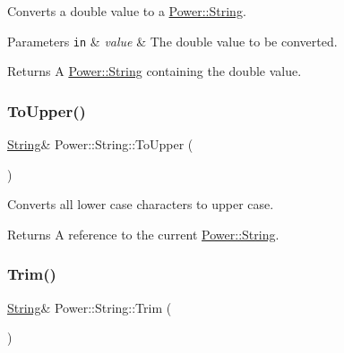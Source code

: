 Converts a double value to a \hyperlink{class_power_1_1_string}{Power\+::\+String}. 


\begin{DoxyParams}[1]{Parameters}
\mbox{\tt in}  & {\em value} & The double value to be converted. \\
\hline
\end{DoxyParams}
\begin{DoxyReturn}{Returns}
A \hyperlink{class_power_1_1_string}{Power\+::\+String} containing the double value. 
\end{DoxyReturn}
\mbox{\label{class_power_1_1_string_a032aabe48ca5b95b9e089998fb8806fa}} 
\subsubsection{\texorpdfstring{To\+Upper()}{ToUpper()}}
{\footnotesize\ttfamily \hyperlink{class_power_1_1_string}{String}\& Power\+::\+String\+::\+To\+Upper (\begin{DoxyParamCaption}{ }\end{DoxyParamCaption})\hspace{0.3cm}{\ttfamily [inline]}}



Converts all lower case characters to upper case. 

\begin{DoxyReturn}{Returns}
A reference to the current \hyperlink{class_power_1_1_string}{Power\+::\+String}. 
\end{DoxyReturn}
\mbox{\label{class_power_1_1_string_a5fb76a178082f7fc2533745941558452}} 
\subsubsection{\texorpdfstring{Trim()}{Trim()}\hspace{0.1cm}{\footnotesize\ttfamily [1/2]}}
{\footnotesize\ttfamily \hyperlink{class_power_1_1_string}{String}\& Power\+::\+String\+::\+Trim (\begin{DoxyParamCaption}{ }\end{DoxyParamCaption})\hspace{0.3cm}{\ttfamily [inline]}}



